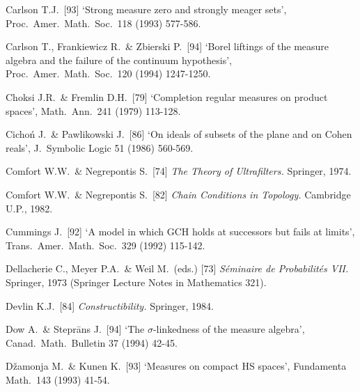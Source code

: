 {Carlson T.J.\ [93] `Strong measure zero and strongly meager sets',
Proc.\ Amer.\ Math.\ Soc.\ 118 (1993) 577-586.
\cmmnt{[534O.]}

Carlson T., Frankiewicz R.\ \& Zbierski P.\ [94]
`Borel liftings of the measure
algebra and the failure of the continuum hypothesis', Proc.\ Amer.\ Math.\ Soc.\
120 (1994) 1247-1250.
\cmmnt{[\S535 {\it notes\/}, 554I.]}

Choksi J.R.\ \& Fremlin D.H.\ [79] `Completion regular measures on
product spaces', Math.\ Ann.\ 241 (1979) 113-128.
\cmmnt{[532I.]}


Cicho\'n J.\ \& Pawlikowski J.\ [86]
`On ideals of subsets of the plane and on Cohen
reals', J.\ Symbolic Logic 51 (1986) 560-569.
\cmmnt{[527F.]}


Comfort W.W.\ \& Negrepontis S.\ [74] {\it The Theory of Ultrafilters.}
Springer, 1974.
\cmmnt{[538F, 538Yb\query.]}

Comfort W.W.\ \& Negrepontis S.\ [82] {\it Chain Conditions in
Topology.}   Cambridge U.P., 1982.
\cmmnt{[516 {\it notes\/}.]}

Cummings J.\ [92] `A model in which GCH holds at successors but fails at
limits',
Trans.\ Amer.\ Math.\ Soc.\ 329 (1992) 115-142.
\cmmnt{[525Z.]}

\medskip%

Dellacherie C., Meyer P.A.\ \& Weil M.\ (eds.) [73]
{\it S\'eminaire de Probabilit\'es VII.}   Springer, 1973
(Springer Lecture Notes in Mathematics 321).

Devlin K.J.\ [84] {\it Constructibility.} Springer, 1984.
\cmmnt{[5A6D.]}


Dow A.\ \& Stepr\=ans J.\ [94] `The $\sigma$-linkedness of the measure
algebra', Canad.\ Math.\ Bulletin 37 (1994) 42-45.
\cmmnt{[524L.]}



D\v{z}amonja M.\ \& Kunen K.\ [93] `Measures on compact HS spaces',
Fundamenta Math.\ 143 (1993) 41-54.
\cmmnt{[\S531 {\it notes\/}.]}

}

